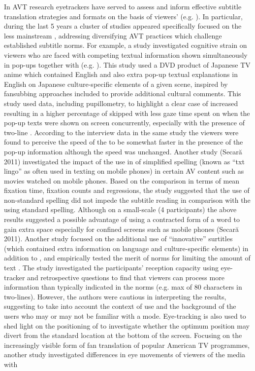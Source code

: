 \documentclass[output=paper]{langsci/langscibook}
\begin{document}
In AVT research eyetrackers have served to assess and inform effective subtitle translation strategies and formats on the basis of viewers'  (e.g. \citealt{ghia2012}). In particular, during the last 5 years a cluster of studies appeared specifically focused on the less mainstream , addressing diversifying AVT practices which challenge established subtitle norms. For example, a study investigated cognitive strain on viewers who are faced with competing textual information shown simultaneously in pop-ups together with  (e.g. \citealt{caffrey2009}). This study used a DVD product of Japanese TV anime which contained English  and also extra pop-up textual explanations in English on Japanese culture-specific elements of a given scene, inspired by fansubbing approaches included to provide additional cultural comments.  This study used  data, including pupillometry, to highlight a clear case of increased  resulting in a higher percentage of skipped  with less gaze time spent on  when the pop-up texts were shown on screen concurrently, especially with the presence of two-line . According to the interview data in the same study the viewers were found to perceive the speed of the  to be somewhat faster in the presence of the pop-up information although the speed was unchanged. Another study (Secar\u{a} 2011) investigated the impact of the use in  of simplified spelling (known as ``txt lingo'' as often used in texting on mobile phones) in certain AV content such as movies watched on mobile phones. Based on the comparison in terms of mean fixation time, fixation counts and regressions, the study suggested that the use of non-standard spelling did not impede the subtitle reading in comparison with the  using standard spelling. Although on a small-scale (4 participants) the above results suggested a possible advantage of using a contracted form of a word to gain extra space especially for confined screens such as mobile phones (Secar\u{a} 2011). Another study focused on the additional use of ``innovative'' surtitles (which contained extra information on language and culture-specific elements) in addition to , and empirically tested the merit of  norms for limiting the amount of text \citep{Künzli2011}. The study investigated the participants' reception capacity using eye-tracker and retrospective questions to find that viewers can process more information than typically indicated in the  norms (e.g. max of 80 characters in two-lines). However, the authors were cautious in interpreting the results, suggesting to take into account the context of use and the background of the users who may or may not be familiar with a  mode.  Eye-tracking is also used to shed light on the positioning of  \citep{Fox2013} to investigate whether the optimum position may divert from the standard location at the bottom of the screen. Focusing on the increasingly visible form of fan translation of popular American TV programmes, another study investigated differences in eye movements of viewers of the media with  
\end{document}
